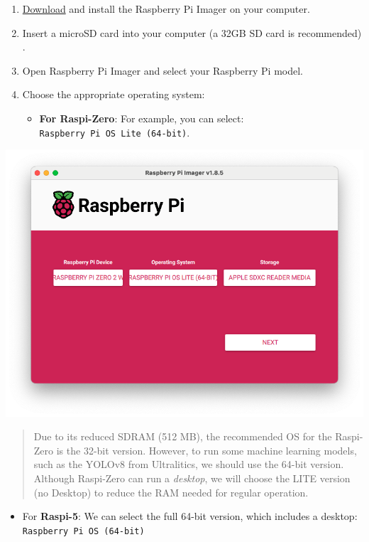 \documentclass[
]{article}
\providecommand{\tightlist}{%
  \setlength{\itemsep}{0pt}\setlength{\parskip}{0pt}}\usepackage{longtable,booktabs,array}
\begin{document}
\begin{enumerate}
\def\labelenumi{\arabic{enumi}.}
\tightlist
\item
  \href{https://www.raspberrypi.com/software/}{Download} and install the
  Raspberry Pi Imager on your computer.
\item
  Insert a microSD card into your computer (a 32GB SD card is
  recommended) .
\item
  Open Raspberry Pi Imager and select your Raspberry Pi model.
\item
  Choose the appropriate operating system:

  \begin{itemize}
  \tightlist
  \item
    \textbf{For Raspi-Zero}: For example, you can select:
    \texttt{Raspberry\ Pi\ OS\ Lite\ (64-bit)}.
  \end{itemize}
\end{enumerate}

\noindent \begin{center}
\includegraphics[width=0.7\linewidth,height=\textheight,keepaspectratio]{images/png/zero-burn.png}
\end{center}

\begin{quote}
Due to its reduced SDRAM (512 MB), the recommended OS for the Raspi-Zero
is the 32-bit version. However, to run some machine learning models,
such as the YOLOv8 from Ultralitics, we should use the 64-bit version.
Although Raspi-Zero can run a \emph{desktop}, we will choose the LITE
version (no Desktop) to reduce the RAM needed for regular operation.
\end{quote}

\begin{itemize}
\tightlist
\item
  For \textbf{Raspi-5}: We can select the full 64-bit version, which
  includes a desktop: \texttt{Raspberry\ Pi\ OS\ (64-bit)}
\end{itemize}
\end{document}
